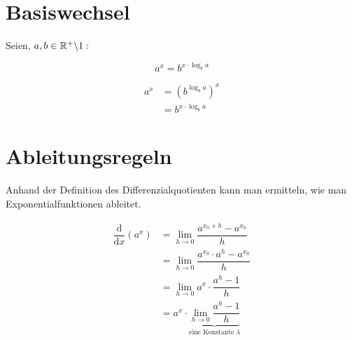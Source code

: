 		\section{Basiswechsel}

Seien, $a,b\in\mathbb{R}^+\backslash1:$
\begin{Theorem}
$$a^x=b^{ x\cdot\log_b a}$$
\end{Theorem}
\begin{Beweis}
\begin{align*}
a^x&=(b^{\log_b a})^x\\
&=b^{x\cdot\log_b a }
\end{align*}
\end{Beweis}

		\section{Ableitungsregeln}

Anhand der Definition des Differenzialquotienten kann man ermitteln, wie man Exponentialfunktionen ableitet.

\begin{Beweis}
\begin{align*}
\dfrac{\text{d}}{\text{d}x}(a^x) &=\lim\limits_{h\to0}\dfrac{a^{{x_0}+h}-a^{x_0}}{h}\\
&=\lim\limits_{h\to0}\dfrac{a^{x_0}\cdot a^h-a^{x_0}}{h}\\
&=\lim\limits_{h\to0}a^x\cdot\dfrac{a^h-1}{h}\\
&=a^x\cdot\underbrace{\lim\limits_{h\to0}\dfrac{a^h-1}{h}}_{\text{eine Konstante }\lambda}
\end{align*}
\end{Beweis}

